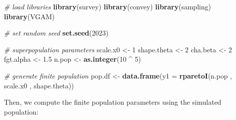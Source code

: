 \documentclass[
]{book}
\newenvironment{Shaded}{\begin{snugshade}}{\end{snugshade}}
\newcommand{\AttributeTok}[1]{\textcolor[rgb]{0.13,0.29,0.53}{#1}}
\newcommand{\CommentTok}[1]{\textcolor[rgb]{0.56,0.35,0.01}{\textit{#1}}}
\newcommand{\ControlFlowTok}[1]{\textcolor[rgb]{0.13,0.29,0.53}{\textbf{#1}}}
\newcommand{\DecValTok}[1]{\textcolor[rgb]{0.00,0.00,0.81}{#1}}
\newcommand{\FloatTok}[1]{\textcolor[rgb]{0.00,0.00,0.81}{#1}}
\newcommand{\FunctionTok}[1]{\textcolor[rgb]{0.13,0.29,0.53}{\textbf{#1}}}
\newcommand{\NormalTok}[1]{#1}
\newcommand{\OtherTok}[1]{\textcolor[rgb]{0.56,0.35,0.01}{#1}}
\newcommand{\SpecialCharTok}[1]{\textcolor[rgb]{0.81,0.36,0.00}{\textbf{#1}}}
\begin{document}
\begin{Shaded}
\begin{Highlighting}[]
\CommentTok{\# load libraries}
\FunctionTok{library}\NormalTok{(survey)}
\FunctionTok{library}\NormalTok{(convey)}
\FunctionTok{library}\NormalTok{(sampling)}
\FunctionTok{library}\NormalTok{(VGAM)}

\CommentTok{\# set random seed}
\FunctionTok{set.seed}\NormalTok{(}\DecValTok{2023}\NormalTok{)}

\CommentTok{\# superpopulation parameters}
\NormalTok{scale.x0 }\OtherTok{\textless{}{-}} \DecValTok{1}
\NormalTok{shape.theta }\OtherTok{\textless{}{-}} \DecValTok{2}
\NormalTok{cha.beta }\OtherTok{\textless{}{-}} \DecValTok{2}
\NormalTok{fgt.alpha }\OtherTok{\textless{}{-}} \FloatTok{1.5}
\NormalTok{n.pop }\OtherTok{\textless{}{-}} \FunctionTok{as.integer}\NormalTok{(}\DecValTok{10} \SpecialCharTok{\^{}} \DecValTok{5}\NormalTok{)}

\CommentTok{\# generate finite population}
\NormalTok{pop.df }\OtherTok{\textless{}{-}}
  \FunctionTok{data.frame}\NormalTok{(}\AttributeTok{y1 =} \FunctionTok{rparetoI}\NormalTok{(n.pop  ,  scale.x0 , shape.theta))}
\end{Highlighting}
\end{Shaded}

Then, we compute the finite population parameters using the simulated population:

\begin{Shaded}
\end{Shaded}
\end{document}
